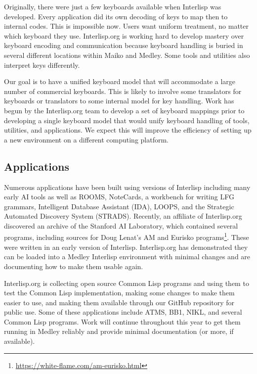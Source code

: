 \documentclass[sigconf]{acmart}
\begin{document}
Originally, there were just a few keyboards available when Interlisp was developed. Every application did its own decoding of keys to map then to internal codes. This is impossible now. Users want uniform treatment, no matter which keyboard they use. Interlisp.org is working hard to develop mastery over keyboard encoding and communication because keyboard handling is buried in several different locations within Maiko and Medley. Some tools and utilities also interpret keys differently.

Our goal is to have a unified keyboard model that will accommodate a large number of commercial keyboards. This is likely to involve some translators for keyboards or translators to some internal model for key handling. Work has begun by the Interlisp.org team to develop a set of keyboard mappings prior to developing a single keyboard model that would unify keyboard handling of tools, utilities, and applications. We expect this will improve the efficiency of setting up a new environment on a different computing platform.

\subsection{Applications}

Numerous applications have been built using versions of Interlisp including many early AI tools as well as ROOMS\cite{Henderson86}, NoteCards\cite{Xerox85}, a workbench for writing LFG grammars\cite{Kaplan03}, Intelligent Database Assistant (IDA), LOOPS, and the Strategic Automated Discovery System (STRADS). Recently, an affiliate of Interlisp.org discovered an archive of the Stanford AI Laboratory, which contained several programs, including sources for Doug Lenat's AM and Eurisko programs\footnote{\url{https://white-flame.com/am-eurisko.html}}. These were written in an early version of Interlisp. Interlisp.org has demonstrated they can be loaded into a Medley Interlisp environment with minimal changes and are documenting how to make them usable again.

Interlisp.org is collecting open source Common Lisp programs and using them to test the Common Lisp implementation, making some changes to make them easier to use, and making them available through our GitHub repository for public use. Some of these applications include ATMS, BB1, NIKL, and several Common Lisp programs. Work will continue throughout this year to get them running in Medley reliably and provide minimal documentation (or more, if available).
\end{document}
